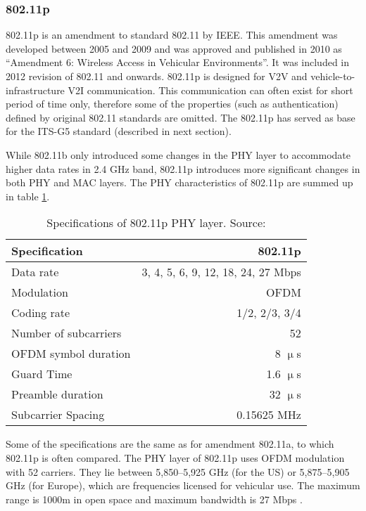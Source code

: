 \subsubsection{802.11p} \label{sec:802.11p}
% 
802.11p is an amendment to standard 802.11 by \acrshort{IEEE}. This amendment was developed between 2005 and 2009 and was approved and published in 2010 as \enquote{Amendment 6: Wireless Access in Vehicular Environments}. It was included in 2012 revision of 802.11 and onwards.
802.11p is designed for \acrshort{V2V} and vehicle-to-infrastructure \acrshort{V2I} communication. This communication can often exist for short period of time only, therefore some of the properties (such as authentication) defined by original 802.11 standards are omitted. The 802.11p has served as base for the ITS-G5 standard (described in next section).\par
% 
% 
While 802.11b only introduced some changes in the \acrshort{PHY} layer to accommodate higher data rates in 2.4 GHz band, 802.11p introduces more significant changes in both \acrshort{PHY} and \acrshort{MAC} layers.
The \acrshort{PHY} characteristics of 802.11p are summed up in table \ref{table:11pPHY}.
% 
\begin{table}[h]
\centering
\begin{tabular}{|l|r|}
    \hline
    \rowcolor{lightgray} Specification & 802.11p \\
    \hline
    Data rate & 3, 4, 5, 6, 9, 12, 18, 24, 27 Mbps \\
    \hline
    Modulation & \acrshort{OFDM} \\
    \hline
    Coding rate & 1/2, 2/3, 3/4 \\
    \hline
    Number of subcarriers & 52 \\
    \hline
    \acrshort{OFDM} symbol duration & 8 $\upmu$s \\
    \hline
    Guard Time & 1.6 $\upmu$s \\
    \hline
    Preamble duration & 32 $\upmu$s \\
    \hline
    Subcarrier Spacing & 0.15625 MHz \\
    \hline
\end{tabular}
\caption{Specifications of 802.11p \acrshort{PHY} layer. Source: \cite{Abdelgader2014TheChallenges}}
\label{table:11pPHY}
\end{table}
% 
Some of the specifications are the same as for amendment 802.11a, to which 802.11p is often compared. The \acrshort{PHY} layer of 802.11p uses \acrshort{OFDM} modulation with 52 carriers.
They lie between 5,850–5,925 GHz (for the US) or 5,875–5,905 GHz (for Europe), which are frequencies licensed for vehicular use. The maximum range is 1000m in open space and maximum bandwidth is 27 Mbps \cite{Abdelgader2014TheChallenges}.
